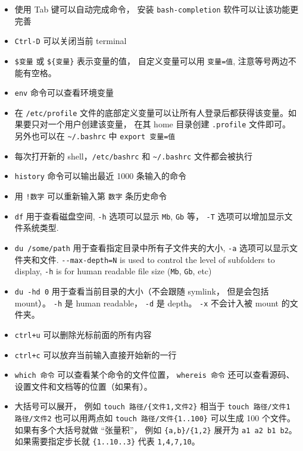 \begin{itemize}
\item 使用 Tab 键可以自动完成命令， 安装 \verb|bash-completion| 软件可以让该功能更完善
\item \verb`Ctrl-D` 可以关闭当前 terminal
\item \verb`$变量` 或 \verb|${变量}| 表示变量的值， 自定义变量可以用 \verb`变量=值`, 注意等号两边不能有空格。
\item \verb`env` 命令可以查看环境变量
\item 在 \verb`/etc/profile` 文件的底部定义变量可以让所有人登录后都获得该变量。如果要只对一个用户创建该变量， 在其 home 目录创建 \verb|.profile| 文件即可。 另外也可以在 \verb|~/.bashrc| 中 \verb|export 变量=值|
\item 每次打开新的 shell，\verb`/etc/bashrc` 和 \verb`~/.bashrc` 文件都会被执行
\item \verb|history| 命令可以输出最近 1000 条输入的命令
\item 用 \verb`!数字` 可以重新输入第 \verb`数字` 条历史命令
\item \verb`df` 用于查看磁盘空间, \verb`-h` 选项可以显示 \verb`Mb`, \verb`Gb` 等， \verb|-T| 选项可以增加显示文件系统类型.
\item \verb`du /some/path` 用于查看指定目录中所有子文件夹的大小, \verb`-a` 选项可以显示文件夹和文件. \verb`--max-depth=N` is used to control the level of subfolders to display, \verb`-h` is for human readable file size (\verb`Mb`, \verb`Gb`, etc)
\item \verb|du -hd 0| 用于查看当前目录的大小（不会跟随 symlink， 但是会包括 mount）。 \verb|-h| 是 human readable， \verb|-d| 是 depth。 \verb|-x| 不会计入被 mount 的文件夹。
\item \verb`ctrl+u` 可以删除光标前面的所有内容
\item \verb`ctrl+c` 可以放弃当前输入直接开始新的一行
\item \verb|which 命令| 可以查看某个命令的文件位置， \verb|whereis 命令| 还可以查看源码、设置文件和文档等的位置（如果有）。
\item 大括号可以展开， 例如 \verb|touch 路径/{文件1,文件2}| 相当于 \verb|touch 路径/文件1 路径/文件2| 也可以用两点如 \verb|touch 路径/文件{1..100}| 可以生成 100 个文件。 如果有多个大括号就做 “张量积”， 例如 \verb|{a,b}/{1,2}| 展开为 \verb|a1 a2 b1 b2|。 如果需要指定步长就 \verb|{1..10..3}| 代表 \verb|1,4,7,10|。
\end{itemize}

